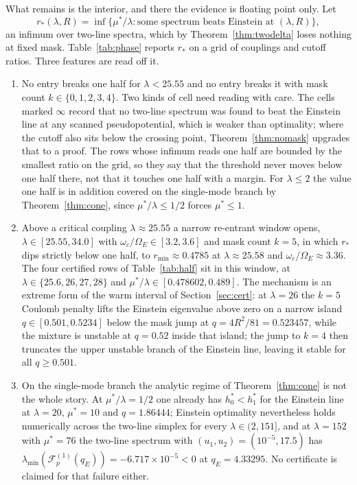 \documentclass[11pt]{article}
\newcommand{\OmE}{\Omega_E}
\newcommand{\Fcal}{\mathcal F}
\newcommand{\muS}{\mu^{*}}
\theoremstyle{definition}
\theoremstyle{remark}
\begin{document}
What remains is the interior, and there the evidence is floating point only. Let
\[
r_*(\lambda,R)=\inf\big\{\muS/\lambda:\text{some spectrum beats Einstein at }
(\lambda,R)\big\},
\]
an infimum over two-line spectra, which by Theorem~\ref{thm:twodelta} loses nothing at
fixed mask. Table~\ref{tab:phase} reports $r_*$ on a grid of couplings and cutoff ratios.
Three features are read off it.

\begin{enumerate}[label=(\arabic*),leftmargin=2.2em]
\item No entry breaks one half for $\lambda<25.55$ and no entry breaks it with mask count
$k\in\{0,1,2,3,4\}$. Two kinds of cell need reading with care. The cells marked $\infty$
record that no two-line spectrum was found to beat the Einstein line at any scanned
pseudopotential, which is weaker than optimality; where the cutoff also sits below the
crossing point, Theorem~\ref{thm:nomask} upgrades that to a proof. The rows whose infimum
reads one half are bounded by the smallest ratio on the grid, so they say that the
threshold never moves below one half there, not that it touches one half with a margin.
For $\lambda\le2$ the value one half is in addition covered on the single-mode branch by
Theorem~\ref{thm:cone}, since $\muS/\lambda\le1/2$ forces $\muS\le1$.
\item Above a critical coupling $\lambda\approx25.55$ a narrow re-entrant window opens,
$\lambda\in[25.55,34.0]$ with $\omega_c/\OmE\in[3.2,3.6]$ and mask count $k=5$, in which
$r_*$ dips strictly below one half, to $r_{\min}\approx0.4785$ at
$\lambda\approx25.58$ and $\omega_c/\OmE\approx3.36$. The four certified rows of Table~\ref{tab:half} sit in this
window, at $\lambda\in\{25.6,26,27,28\}$ and $\muS/\lambda\in[0.478602,0.489]$. The
mechanism is an extreme form of the warm interval of Section~\ref{sec:cert}: at
$\lambda=26$ the $k=5$ Coulomb penalty lifts the Einstein eigenvalue above zero on a narrow
island $q\in[0.501,0.5234]$ below the mask jump at $q=4R^2/81=0.523457$, while the
mixture is unstable at $q=0.52$ inside that island; the jump to $k=4$ then truncates the
upper unstable branch of the Einstein line, leaving it stable for all $q\ge0.501$.
\item On the single-mode branch the analytic regime of Theorem~\ref{thm:cone} is not the
whole story. At $\muS/\lambda=1/2$ one already has $h^*_0<h^*_1$ for the Einstein line at
$\lambda=20$, $\muS=10$ and $q=1.86444$; Einstein optimality nevertheless holds numerically
across the two-line simplex for every $\lambda\in(2,151]$, and at $\lambda=152$ with
$\muS=76$ the two-line spectrum with $(u_1,u_2)=(10^{-5},17.5)$ has
$\lambda_{\min}(\Fcal_p^{(1)}(q_E))=-6.717\times10^{-5}<0$ at $q_E=4.33295$. No certificate
is claimed for that failure either.
\end{enumerate}
\end{document}
